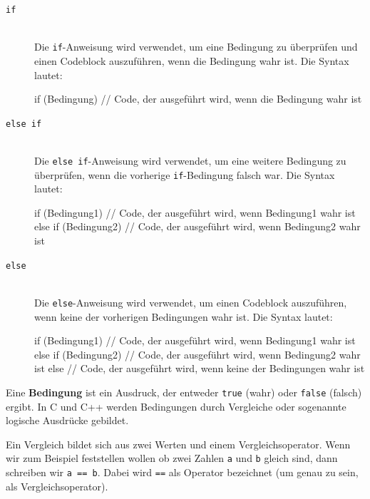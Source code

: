 \begin{description}
    \item[\texttt{if}]\hfill\\
        Die \texttt{if}-Anweisung wird verwendet, um eine Bedingung zu überprüfen und einen Codeblock auszuführen, wenn die Bedingung wahr ist. Die Syntax lautet:
\begin{code}
if (Bedingung) {
    // Code, der ausgeführt wird, wenn die Bedingung wahr ist
}
\end{code}

    \item[\texttt{else if}]\hfill\\
        Die \texttt{else if}-Anweisung wird verwendet, um eine weitere Bedingung zu überprüfen, wenn die vorherige \texttt{if}-Bedingung falsch war. Die Syntax lautet:
\begin{code}
if (Bedingung1) {
    // Code, der ausgeführt wird, wenn Bedingung1 wahr ist
} else if (Bedingung2) {
    // Code, der ausgeführt wird, wenn Bedingung2 wahr ist
}
\end{code}
    \item[\texttt{else}]\hfill\\
        Die \texttt{else}-Anweisung wird verwendet, um einen Codeblock auszuführen, wenn keine der vorherigen Bedingungen wahr ist. Die Syntax lautet:
\begin{code}
if (Bedingung1) {
    // Code, der ausgeführt wird, wenn Bedingung1 wahr ist
} else if (Bedingung2) {
    // Code, der ausgeführt wird, wenn Bedingung2 wahr ist
} else {
    // Code, der ausgeführt wird, wenn keine der Bedingungen wahr ist
}
\end{code}
\end{description}
Eine \textbf{Bedingung} ist ein Ausdruck, der entweder \texttt{true} (wahr) oder \texttt{false} (falsch) ergibt. In C und C++ werden Bedingungen durch Vergleiche oder sogenannte logische Ausdrücke gebildet. 

Ein Vergleich bildet sich aus zwei Werten und einem Vergleichsoperator. Wenn wir zum Beispiel feststellen wollen ob zwei Zahlen \texttt{a} und \texttt{b} gleich sind, dann schreiben wir \texttt{a == b}. Dabei wird \texttt{==} als Operator bezeichnet (um genau zu sein, als Vergleichsoperator). 


